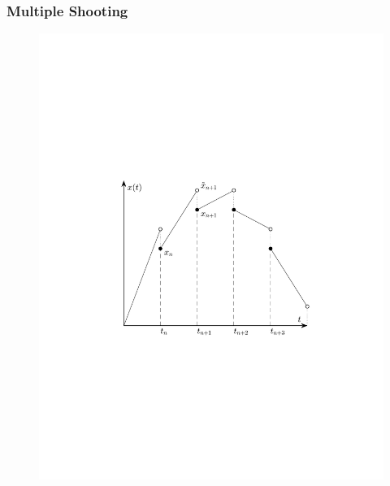\documentclass{beamer}
\begin{document}
\begin{frame}
	\frametitle{Multiple Shooting}
	
	\begin{figure}[bth]
	  \begin{center}
	    \includegraphics[trim=1cm 5cm 0cm 8cm, clip=true, 
	    width=\linewidth]{Exc/multShootPlot}
	  \end{center}
	\end{figure}
\end{frame}
\end{document}
